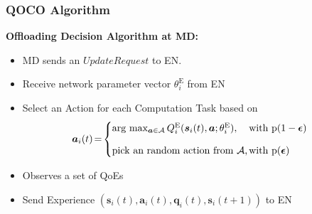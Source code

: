 \begin{frame}
	\frametitle{QOCO Algorithm}

	\textbf{Offloading Decision Algorithm at MD:}
	\vfill


	
	\begin{itemize}[]
		
		
		\item MD sends an $\textit{UpdateRequest}$ to EN.
		
		\item Receive network parameter vector $\theta_i^{\text{E}}$ from EN
		
		\item Select an Action for each Computation Task based on 
			\begin{alignat}{2}
			\hspace*{-2mm}\boldsymbol{a}_i(t) \hspace*{-0.5mm} = \hspace*{-0.5mm}
			\begin{cases} 
				\text{arg $\max_{\boldsymbol{a}\in \mathcal{A}}Q_i^{\text{E}}(\boldsymbol{s}_i(t), \boldsymbol{a}; \theta^{\text{E}}_i)$,} &		\hspace*{-3mm} \text{with $\boldsymbol{\text{p}}(1 -\boldsymbol{\epsilon})$} \vspace{3mm}\\
				\text{pick an random action from $\mathcal{A}$,} & \hspace*{-3mm} \text{with $\boldsymbol{\text{p}}(\boldsymbol{\epsilon})$}
			\end{cases}
			\label{26}  
		\end{alignat}

		
		\item Observes a set of QoEs

		\item Send Experience $(\boldsymbol{s}_i(t), \boldsymbol{a}_i(t), \boldsymbol{q}_i(t), \boldsymbol{s}_i(t+1))$ to EN
		
	\end{itemize}
	
	
\end{frame}

